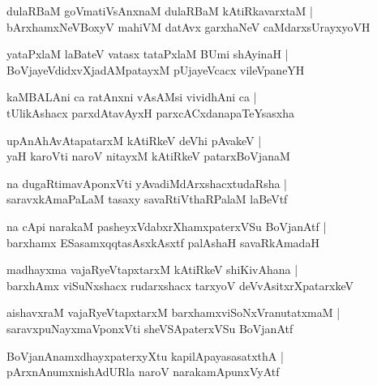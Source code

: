 \documentclass[twoside,12pt,openright]{book}
\newcounter{shloka}[chapter]
\begin{document}
\begin{shloka}%
dulaRBaM goVmatiVsAnxnaM dulaRBaM kAtiRkavarxtaM |\\
bArxhamxNeVBoxyV mahiVM datAvx garxhaNeV caMdarxsUrayxyoVH
\end{shloka}

\begin{shloka}%
yataPxlaM laBateV vatasx tataPxlaM BUmi shAyinaH |\\
BoVjayeVdidxvXjadAMpatayxM pUjayeVcacx vileVpaneYH
\end{shloka}

\begin{shloka}%
kaMBALAni ca ratAnxni vAsAMsi vividhAni ca |\\
tUlikAshacx parxdAtavAyxH parxcACxdanapaTeYsasxha 
\end{shloka}

\begin{shloka}%
upAnAhAvAtapatarxM kAtiRkeV deVhi pAvakeV |\\
yaH karoVti naroV nitayxM kAtiRkeV patarxBoVjanaM 
\end{shloka}

\begin{shloka}%
na dugaRtimavAponxVti yAvadiMdArxshacxtudaRsha |\\
saravxkAmaPaLaM tasaxy savaRtiVthaRPalaM laBeVtf
\end{shloka}

\begin{shloka}%
na cApi narakaM pasheyxVdabxrXhamxpaterxVSu BoVjanAtf |\\
barxhamx ESasamxqqtasAsxkAsxtf palAshaH savaRkAmadaH
\end{shloka}

\begin{shloka}%
madhayxma vajaRyeVtapxtarxM kAtiRkeV shiKivAhana |\\
barxhAmx viSuNxshacx rudarxshacx tarxyoV deVvAsitxrXpatarxkeV 
\end{shloka}

\begin{shloka}%
aishavxraM vajaRyeVtapxtarxM barxhamxviSoNxVranutatxmaM |\\
saravxpuNayxmaVponxVti sheVSApaterxVSu BoVjanAtf 
\end{shloka}

\begin{shloka}%
BoVjanAnamxdhayxpaterxyXtu kapilApayasasatxthA |\\
pArxnAnumxnishAdURla naroV narakamApunxVyAtf
\end{shloka}
\end{document}
